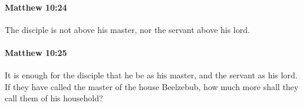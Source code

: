 		\paragraph{Matthew 10:24} %
			\label{MATTHEW-10-24}

			The disciple is not above his master, nor the servant above his lord.

			\begin{framed}
			\scriptsize
				\begin{compactdesc}
					\item[SBLG] 
				\end{compactdesc}
			\end{framed}

		\paragraph{Matthew 10:25} %
			\label{MATTHEW-10-25}

			It is enough for the disciple that he be as his master, and the servant as his lord. If they have called the master of the house Beelzebub, how much more shall they call them of his household?

